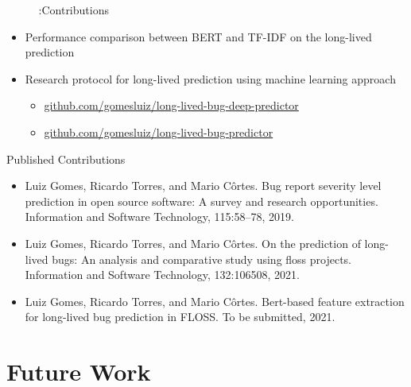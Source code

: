 
\begin{frame}[t,fragile]{\colorbox{OliveGreen}{\textcolor{White}{Goal 3}}:Contributions}
\begin{itemize}
    \item Performance \alert{comparison} between BERT and TF-IDF on the long-lived prediction
    \item Research \alert{protocol} for long-lived prediction using machine learning approach 
    \begin{itemize}
        \item {\footnotesize \url{github.com/gomesluiz/long-lived-bug-deep-predictor}}
        \item {\footnotesize \url{github.com/gomesluiz/long-lived-bug-predictor}}
    \end{itemize}
\end{itemize}
\end{frame}

\begin{frame}[t,fragile]{Published Contributions}
    \begin{itemize}
        \item Luiz Gomes, Ricardo Torres, and Mario Côrtes. Bug report severity level prediction
        in open source software: A survey and research opportunities. Information and
        Software Technology, 115:58–78, 2019.
        \item Luiz Gomes, Ricardo Torres, and Mario Côrtes. On the prediction of long-lived bugs:
        An analysis and comparative study using floss projects. Information and Software
        Technology, 132:106508, 2021.
        \item Luiz Gomes, Ricardo Torres, and Mario Côrtes. Bert-based feature extraction for
        long-lived bug prediction in FLOSS. To be submitted, 2021.
    \end{itemize}
    \end{frame}

\section{Future Work}

